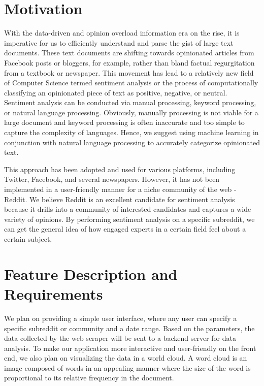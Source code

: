 \documentclass[11pt]{article}
\begin{document}
\section{Motivation}
\tab With the data-driven and opinion overload information era on the rise, it is imperative for us to efficiently understand and parse the gist of large text documents. These text documents are shifting towards opinionated articles from Facebook posts or bloggers, for example, rather than bland factual regurgitation from a textbook or newspaper. This movement has lead to a relatively new field of Computer Science termed sentiment analysis or the process of computationally classifying an opinionated piece of text as positive, negative, or neutral.
Sentiment analysis can be conducted via manual processing, keyword processing, or natural language processing. Obviously, manually processing is not viable for a large document and keyword processing is often inaccurate and too simple to capture the complexity of languages. Hence, we suggest using machine learning in conjunction with natural language processing to accurately categorize opinionated text.
\\
\par This approach has been adopted and used for various platforms, including Twitter, Facebook, and several newspapers. However, it has not been implemented in a user-friendly manner for a niche community of the web - Reddit. We believe Reddit is an excellent candidate for sentiment analysis because it drills into a community of interested candidates and captures a wide variety of opinions. By performing sentiment analysis on a specific subreddit, we can get the general idea of how engaged experts in a certain field feel about a certain subject.
\section{Feature Description and Requirements}
\tab We plan on providing a simple user interface, where any user can specify a specific subreddit or community and a date range. Based on the parameters, the data collected by the web scraper will be sent to a backend server for data analysis. To make our application more interactive and user-friendly on the front end, we also plan on visualizing the data in a world cloud. A word cloud is an image composed of words in an appealing manner where the size of the word is proportional to its relative frequency in the document.
\end{document}
